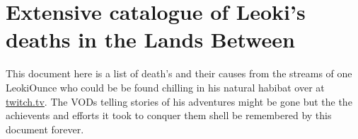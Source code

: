 \section*{Extensive catalogue of Leoki's deaths in the Lands Between}

This document here is a list of death's and their causes from the streams of one LeokiOunce who could be be found chilling in his natural habibat over at \href{https://www.twitch.tv/leokiounce}{twitch.tv}. The VODs telling stories of his adventures might be gone but the the achievents and efforts it took to conquer them shell be remembered by this document forever.
